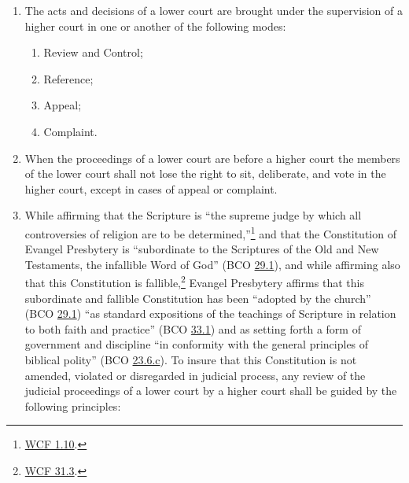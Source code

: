 \documentclass[
]{book}
\providecommand{\tightlist}{%
  \setlength{\itemsep}{0pt}\setlength{\parskip}{0pt}}
\begin{document}
\protect\hypertarget{chapter-slug-43-modes-in-which-the-proceedings-of-lower-courts-come-under-the-supervision-of-higher-courts}{\href{}{}}

\begin{enumerate}
\def\labelenumi{\arabic{enumi}.}
\tightlist
\item
  \protect\hypertarget{43}{\href{}{}}The acts and decisions of a lower court are brought under the supervision of a higher court in one or another of the following modes:

  \begin{enumerate}
  \def\labelenumii{\alph{enumii}.}
  \tightlist
  \item
    Review and Control;
  \item
    Reference;
  \item
    Appeal;
  \item
    Complaint.
  \end{enumerate}
\item
  When the proceedings of a lower court are before a higher court the members of the lower court shall not lose the right to sit, deliberate, and vote in the higher court, except in cases of appeal or complaint.
\item
  While affirming that the Scripture is ``the supreme judge by which all controversies of religion are to be determined,''\footnote{\href{https://evangelpresbytery.com/westminster-confession-of-faith/\#1.10}{WCF 1.10}.} and that the Constitution of Evangel Presbytery is ``subordinate to the Scriptures of the Old and New Testaments, the infallible Word of God'' (BCO \protect\hyperlink{29.1}{29.1}), and while affirming also that this Constitution is fallible,\footnote{\href{https://evangelpresbytery.com/westminster-confession-of-faith/\#31.3}{WCF 31.3}.} Evangel Presbytery affirms that this subordinate and fallible Constitution has been ``adopted by the church'' (BCO \protect\hyperlink{29.1}{29.1}) ``as standard expositions of the teachings of Scripture in relation to both faith and practice'' (BCO \protect\hyperlink{33.1}{33.1}) and as setting forth a form of government and discipline ``in conformity with the general principles of biblical polity'' (BCO \protect\hyperlink{23.6.c}{23.6.c}). To insure that this Constitution is not amended, violated or disregarded in judicial process, any review of the judicial proceedings of a lower court by a higher court shall be guided by the following principles:


\end{enumerate}
\end{document}
